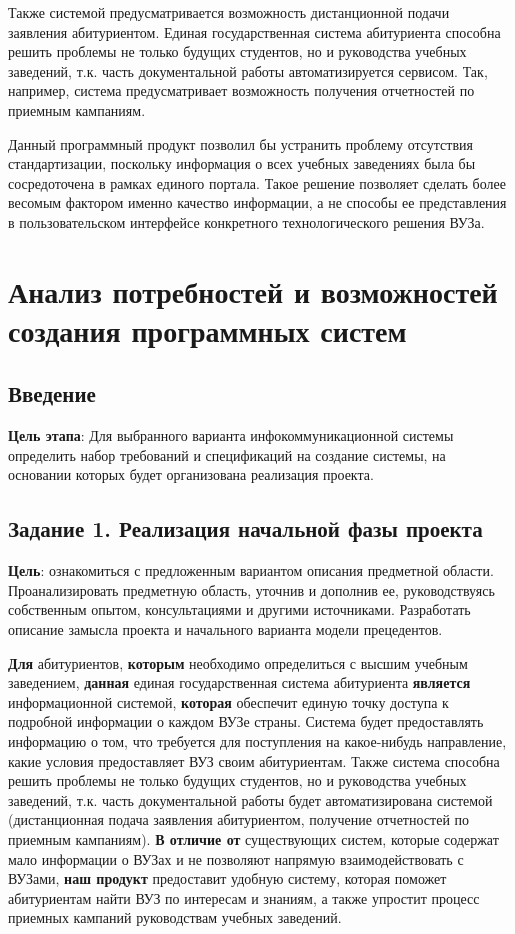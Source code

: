 \documentclass[a4paper, 14pt]{extarticle}
\begin{document}
Также системой предусматривается возможность дистанционной подачи заявления
абитуриентом. Единая государственная система абитуриента способна решить
проблемы не только будущих студентов, но и руководства учебных заведений, т.к.
часть документальной работы автоматизируется сервисом. Так, например, система
предусматривает возможность получения отчетностей по приемным кампаниям.

Данный программный продукт позволил бы устранить проблему отсутствия
стандартизации, поскольку информация о всех учебных заведениях была бы
сосредоточена в рамках единого портала. Такое решение позволяет сделать более
весомым фактором именно качество информации, а не способы ее представления в
пользовательском интерфейсе конкретного технологического решения ВУЗа.

\section{Анализ потребностей и возможностей создания программных систем}

\subsection*{Введение}

\textbf{Цель этапа}: Для выбранного варианта инфокоммуникационной системы
определить набор требований и спецификаций на создание системы, на основании
которых будет организована реализация проекта.

\subsection*{Задание 1. Реализация начальной фазы проекта}

\textbf{Цель}: ознакомиться с предложенным вариантом описания предметной
области. Проанализировать предметную область, уточнив и дополнив ее,
руководствуясь собственным опытом, консультациями и другими источниками.
Разработать описание замысла проекта и начального варианта модели прецедентов.

\textbf{Для} абитуриентов, \textbf{которым} необходимо определиться с высшим
учебным заведением, \textbf{данная} единая государственная система абитуриента
\textbf{является} информационной системой, \textbf{которая} обеспечит единую
точку доступа к подробной информации о каждом ВУЗе страны. Система будет
предоставлять информацию о том, что требуется для поступления на какое-нибудь
направление, какие условия предоставляет ВУЗ своим абитуриентам. Также система
способна решить проблемы не только будущих студентов, но и руководства учебных
заведений, т.к. часть документальной работы будет автоматизирована системой
(дистанционная подача заявления абитуриентом, получение отчетностей по приемным
кампаниям). \textbf{В отличие от} существующих систем, которые содержат мало
информации о ВУЗах и не позволяют напрямую взаимодействовать с ВУЗами,
\textbf{наш продукт} предоставит удобную систему, которая поможет абитуриентам
найти ВУЗ по интересам и знаниям, а также упростит процесс приемных кампаний
руководствам учебных заведений.
\end{document}
